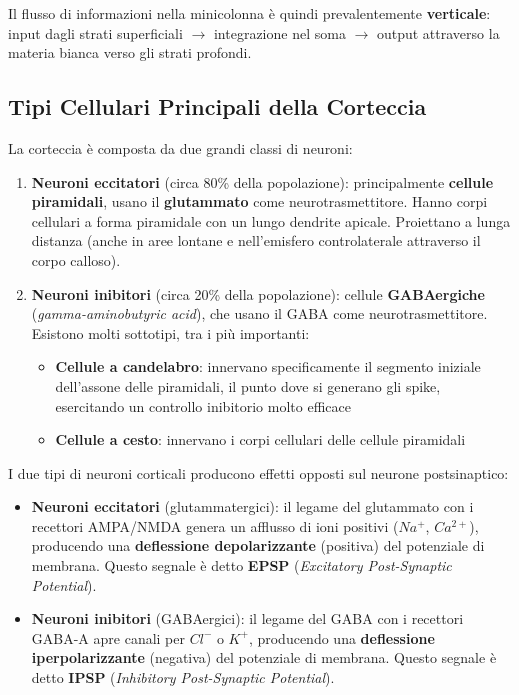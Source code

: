 Il flusso di informazioni nella minicolonna è quindi prevalentemente \textbf{verticale}: input dagli strati superficiali $\rightarrow$ integrazione nel soma $\rightarrow$ output attraverso la materia bianca verso gli strati profondi.

\subsection{Tipi Cellulari Principali della Corteccia}

La corteccia è composta da due grandi classi di neuroni:

\begin{enumerate}
    \item \textbf{Neuroni eccitatori} (circa 80\% della popolazione): principalmente \textbf{cellule piramidali}, usano il \textbf{glutammato} come neurotrasmettitore. Hanno corpi cellulari a forma piramidale con un lungo dendrite apicale. Proiettano a lunga distanza (anche in aree lontane e nell'emisfero controlaterale attraverso il corpo calloso).
    \item \textbf{Neuroni inibitori} (circa 20\% della popolazione): cellule \textbf{GABAergiche} (\textit{gamma-aminobutyric acid}), che usano il GABA come neurotrasmettitore. Esistono molti sottotipi, tra i più importanti:
    \begin{itemize}
        \item \textbf{Cellule a candelabro}: innervano specificamente il segmento iniziale dell'assone delle piramidali, il punto dove si generano gli spike, esercitando un controllo inibitorio molto efficace
        \item \textbf{Cellule a cesto}: innervano i corpi cellulari delle cellule piramidali
    \end{itemize}
\end{enumerate}

I due tipi di neuroni corticali producono effetti opposti sul neurone postsinaptico:

\begin{itemize}
    \item \textbf{Neuroni eccitatori} (glutammatergici): il legame del glutammato con i recettori AMPA/NMDA genera un afflusso di ioni positivi ($Na^+$, $Ca^{2+}$), producendo una \textbf{deflessione depolarizzante} (positiva) del potenziale di membrana. Questo segnale è detto \textbf{EPSP} (\textit{Excitatory Post-Synaptic Potential}).
    \item \textbf{Neuroni inibitori} (GABAergici): il legame del GABA con i recettori GABA-A apre canali per $Cl^-$ o $K^+$, producendo una \textbf{deflessione iperpolarizzante} (negativa) del potenziale di membrana. Questo segnale è detto \textbf{IPSP} (\textit{Inhibitory Post-Synaptic Potential}).
\end{itemize}

